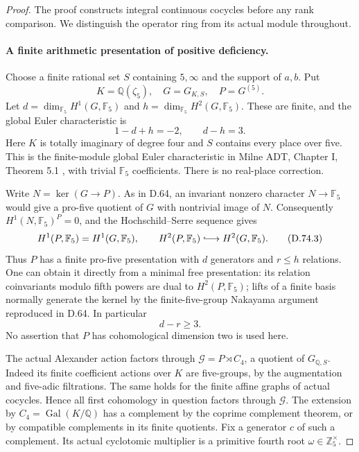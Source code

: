 \begin{proof}
The proof constructs integral continuous cocycles before any
rank comparison. We distinguish the operator ring from its
actual module throughout.

\paragraph{A finite arithmetic presentation of positive deficiency.}
Choose a finite rational set \(S\) containing \(5,\infty\)
and the support of \(a,b\). Put
\[
 K=\mathbb Q(\zeta_5),\quad G=G_{K,S},\quad P=G^{(5)}.
\]
Let \(d=\dim_{\mathbb F_5}H^1(G,\mathbb F_5)\) and
\(h=\dim_{\mathbb F_5}H^2(G,\mathbb F_5)\).
These are finite, and the global Euler characteristic is
\[
                         1-d+h=-2,\qquad d-h=3.
                                                        \tag{D.74.2}
\]
Here \(K\) is totally imaginary of degree four and \(S\)
contains every place over five. This is the finite-module
global Euler characteristic in Milne ADT, Chapter I,
Theorem 5.1 \cite{DE_MilneADT}, with trivial
\(\mathbb F_5\) coefficients.
There is no real-place correction.

Write \(N=\ker(G\to P)\). As in D.64, an invariant
nonzero character \(N\to\mathbb F_5\) would give a
pro-five quotient of \(G\) with nontrivial image of \(N\).
Consequently \(H^1(N,\mathbb F_5)^P=0\), and the
Hochschild--Serre sequence gives
\[
 H^1(P,\mathbb F_5)=H^1(G,\mathbb F_5),\qquad
 H^2(P,\mathbb F_5)\lhook\joinrel\longrightarrow
                                     H^2(G,\mathbb F_5).
                                                        \tag{D.74.3}
\]
Thus \(P\) has a finite pro-five presentation with \(d\)
generators and \(r\le h\) relations. One can obtain it
directly from a minimal free presentation: its relation
coinvariants modulo fifth powers are dual to
\(H^2(P,\mathbb F_5)\); lifts of a finite basis normally
generate the kernel by the finite-five-group Nakayama
argument reproduced in D.64. In particular
\[
                              d-r\ge3.                 \tag{D.74.4}
\]
No assertion that \(P\) has cohomological dimension two
is used here.

The actual Alexander action factors through
\(\mathcal G=P\rtimes C_4\), a quotient of
\(G_{\mathbb Q,S}\). Indeed its finite coefficient
actions over \(K\) are five-groups, by the augmentation
and five-adic filtrations. The same holds for the finite
affine graphs of actual cocycles. Hence all first
cohomology in question factors through \(\mathcal G\).
The extension by \(C_4=\operatorname{Gal}(K/\mathbb Q)\)
has a complement by the coprime complement theorem,
or by compatible complements in its finite quotients.
Fix a generator \(c\) of such a complement. Its actual
cyclotomic multiplier is a primitive fourth root
\(\omega\in\mathbb Z_5^\times\).


\end{proof}
